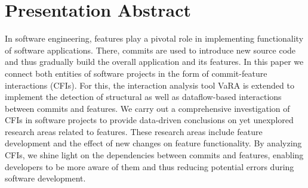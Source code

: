 \begingroup
\let\clearpage\relax
\let\cleardoublepage\relax
\let\cleardoublepage\relax

\section*{Presentation Abstract}\label{ch:abstract}

In software engineering, features play a pivotal role in implementing functionality of software applications.
There, commits are used to introduce new source code and thus gradually build the overall application and its features.
In this paper we connect both entities of software projects in the form of commit-feature interactions (CFIs).
For this, the interaction analysis tool VaRA is extended to implement the detection of structural as well as dataflow-based interactions between commits and features.
We carry out a comprehensive investigation of CFIs in software projects to provide data-driven conclusions on yet unexplored research areas related to features.
These research areas include feature development and the effect of new changes on feature functionality.
By analyzing CFIs, we shine light on the dependencies between commits and features, enabling developers to be more aware of them and thus reducing potential errors during software development.

\iffalse


